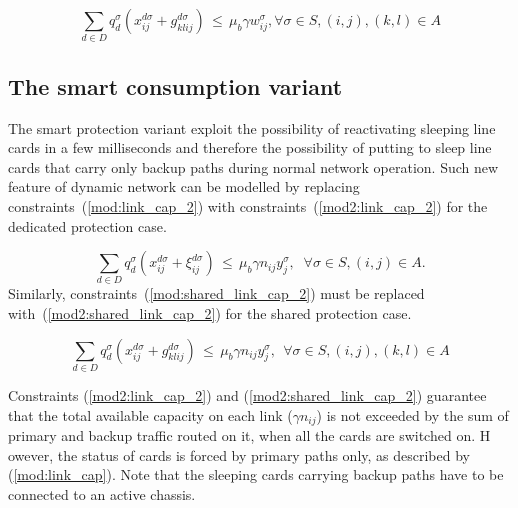 \documentclass[final,5p,times,twocolumn]{elsarticle}
\begin{document}
\begin{equation}\label{mod:shared_link_cap_2}
\sum_{d \in D} q_d^{\sigma} \left(x_{ij}^{d \sigma} + g_{klij}^{d \sigma}\right)\,\leq\, \mu_b \gamma w_{ij}^{\sigma}, \forall \sigma \in S, (i,j),(k,l) \in A
\end{equation}


\subsection{The smart consumption variant}\label{sec:smart}
The smart protection variant exploit the possibility of reactivating sleeping line cards in a few milliseconds and therefore the possibility of putting to sleep line cards that carry only backup paths during normal network operation. Such new feature of  dynamic network can be modelled by replacing constraints~(\ref{mod:link_cap_2}) with constraints~(\ref{mod2:link_cap_2}) for the dedicated protection case.

\begin{equation}
\label{mod2:link_cap_2}\sum_{d \in D} q_d^{\sigma}\left(x_{ij}^{d \sigma} + \xi_{ij}^{d \sigma}\right)\,\leq\, \mu_b \gamma n_{ij}  y_{j}^{\sigma},\;\; \forall \sigma \in S,(i,j) \in A.
\end{equation} 
Similarly, constraints~(\ref{mod:shared_link_cap_2}) must be replaced with~(\ref{mod2:shared_link_cap_2}) for the shared protection case.

\begin{equation}
\label{mod2:shared_link_cap_2}\sum_{d \in D} q_d^{\sigma}  \left(x_{ij}^{d \sigma} + g_{klij}^{d \sigma}\right)\,\leq\, \mu_b \gamma n_{ij}y_{j}^{\sigma}, \;\, \forall \sigma \in S, (i,j),(k,l) \in A
\end{equation}

Constraints (\ref{mod2:link_cap_2}) and (\ref{mod2:shared_link_cap_2}) guarantee that the total available capacity on each link ($\gamma n_{ij}$) is not exceeded by the sum of primary and backup traffic routed on it, when all the cards are switched on. H
owever, the status of cards is forced by primary paths only, as described by (\ref{mod:link_cap}). Note that the sleeping cards carrying backup paths have to be connected to an active chassis.
\end{document}
